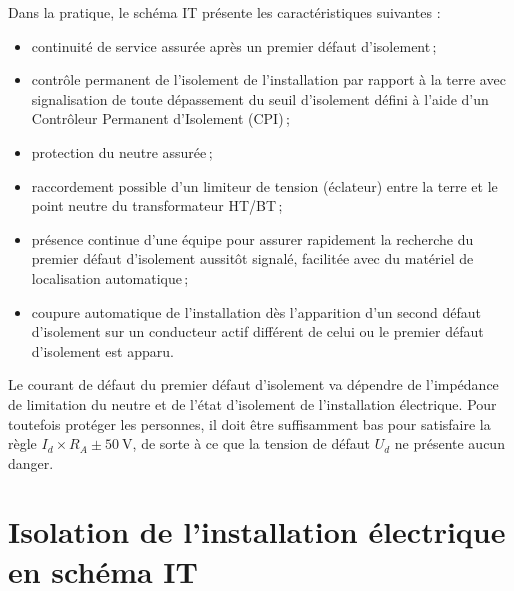 Dans la pratique, le schéma IT présente les caractéristiques suivantes :
\begin{itemize}
\item continuité de service assurée après un premier défaut d'isolement\,;
\item contrôle permanent de l'isolement de l'installation par rapport à la terre avec signalisation de toute dépassement du seuil d'isolement défini à l'aide d'un Contrôleur Permanent d'Isolement (CPI)\,;
\item protection du neutre assurée\,;
\item raccordement possible d'un limiteur de tension (éclateur) entre la terre et le point neutre du transformateur HT/BT\,;
\item présence continue d'une équipe pour assurer rapidement la recherche du premier défaut d'isolement aussitôt signalé, facilitée avec du matériel de localisation automatique\,;
\item coupure automatique de l'installation dès l'apparition d'un second défaut d'isolement sur un conducteur actif différent de celui ou le premier défaut d'isolement est apparu.
\end{itemize}

Le courant de défaut du premier défaut d'isolement va dépendre de l'impédance de limitation du neutre et de l'état d'isolement de l'installation électrique. Pour toutefois protéger les personnes, il doit être suffisamment bas pour satisfaire la règle $I_{d} \times R_{A} \pm \SI{50}{\volt}$, de sorte à ce que la tension de défaut $U_d$ ne présente aucun danger.

\section{Isolation de l'installation électrique en schéma IT\label{sec:isolation_installation_schema_it}}

